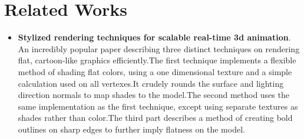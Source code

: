 \documentclass{acmsiggraph}
\begin{document}
\section*{Related Works}

\begin{itemize}
\item
\textbf{Stylized rendering techniques for scalable real-time 3d animation}.
An incredibly popular paper describing three distinct techniques on rendering
flat, cartoon-like graphics efficiently.The first technique implements a
flexible method of shading flat colors, using a one dimensional texture and a
simple calculation used on all vertexes.It crudely rounds the surface and
lighting direction normals to map shades to the model.The second method uses
the same implementation as the first technique, except using separate textures
as shades rather than color.The third part describes a method of creating
bold outlines on sharp edges to further imply flatness on the
model.\cite{lake2000srt}
\end{itemize}



\end{document}
